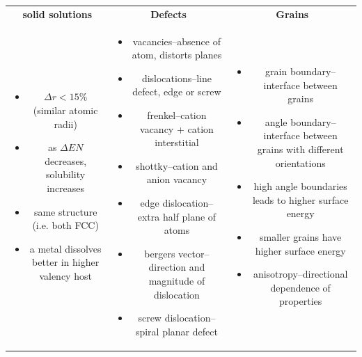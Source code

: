 \documentclass{article}
\begin{document}
\begin{table}[H]
    \small
    \centering
    \begin{tabular}{ c c c }
        \textbf{solid solutions} & \textbf{Defects} & \textbf{Grains} \\
        \begin{minipage}{0.3\textwidth}
            \begin{itemize}
                \item $\Delta r < 15\%$ (similar atomic radii)
                \item as $\Delta EN$ decreases, solubility increases
                \item same structure (i.e. both FCC)
                \item a metal dissolves better in higher valency host
            \end{itemize}
        \end{minipage} &
        \begin{minipage}{0.3\textwidth}
            \begin{itemize}
                \item vacancies--absence of atom, distorts planes
                \item dislocations--line defect, edge or screw
                \item frenkel--cation vacancy + cation interstitial
                \item shottky--cation and anion vacancy
                \item edge dislocation--extra half plane of atoms
                \item bergers vector--direction and magnitude of dislocation
                \item screw dislocation--spiral planar defect
            \end{itemize}
        \end{minipage} &
        \begin{minipage}{0.3\textwidth}
            \begin{itemize}
                \item grain boundary--interface between grains
                \item angle boundary--interface between grains with different orientations
                \item high angle boundaries leads to higher surface energy
                \item smaller grains have higher surface energy
                \item anisotropy--directional dependence of properties
            \end{itemize}
        \end{minipage} \\
    \end{tabular}
\end{table}
\end{document}
